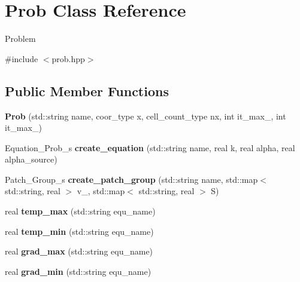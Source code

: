 \hypertarget{classProb}{
\section{Prob Class Reference}
\label{classProb}
}


Problem  


{\ttfamily \#include $<$prob.hpp$>$}\subsection*{Public Member Functions}
\begin{DoxyCompactItemize}
\item 
\hypertarget{classProb_a4d146873812b11594835eeb221057ce3}{
{\bfseries Prob} (std::string name, coor\_\-type x, cell\_\-count\_\-type nx, int it\_\-max\_, int it\_\-max\_)}
\label{classProb_a4d146873812b11594835eeb221057ce3}

\item 
\hypertarget{classProb_a9e42af858cc616a84ffa860ed30703cc}{
Equation\_\-Prob\_\-s {\bfseries create\_\-equation} (std::string name, real k, real alpha, real alpha\_\-source)}
\label{classProb_a9e42af858cc616a84ffa860ed30703cc}

\item 
\hypertarget{classProb_a3cc8bff1793014e79c9f543c6b06db37}{
Patch\_\-Group\_\-s {\bfseries create\_\-patch\_\-group} (std::string name, std::map$<$ std::string, real $>$ v\_, std::map$<$ std::string, real $>$ S)}
\label{classProb_a3cc8bff1793014e79c9f543c6b06db37}

\item 
\hypertarget{classProb_a70dca1f3332e57f72b834ba91d52ca31}{
real {\bfseries temp\_\-max} (std::string equ\_\-name)}
\label{classProb_a70dca1f3332e57f72b834ba91d52ca31}

\item 
\hypertarget{classProb_ac1bce1f293f1ec1c251730db1a1d0313}{
real {\bfseries temp\_\-min} (std::string equ\_\-name)}
\label{classProb_ac1bce1f293f1ec1c251730db1a1d0313}

\item 
\hypertarget{classProb_a9fff19c6e6676c72153dc0ed32b1e6a9}{
real {\bfseries grad\_\-max} (std::string equ\_\-name)}
\label{classProb_a9fff19c6e6676c72153dc0ed32b1e6a9}

\item 
\hypertarget{classProb_a6dc764bdb12b430c1a28d73925f6c6d8}{
real {\bfseries grad\_\-min} (std::string equ\_\-name)}
\label{classProb_a6dc764bdb12b430c1a28d73925f6c6d8}


\end{DoxyCompactItemize}
